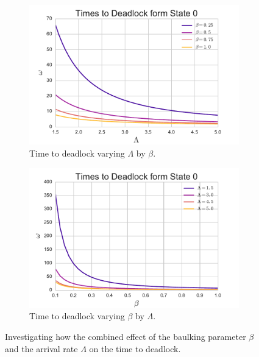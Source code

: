 \documentclass{article}
\begin{document}
\begin{figure}
\begin{center}
\begin{subfigure}[b]{0.45\textwidth}
    \includegraphics[width=\textwidth]{img/varylambda_bybeta.pdf}
    \caption{Time to deadlock varying $\Lambda$ by $\beta$.}
    \label{fig:varyLambdabybeta}
\end{subfigure}
\begin{subfigure}[b]{0.45\textwidth}
    \includegraphics[width=\textwidth]{img/varybeta_bylambda.pdf}
    \caption{Time to deadlock varying $\beta$ by $\Lambda$.}
    \label{fig:varybetabyLambda}
\end{subfigure}
\end{center}
\caption{Investigating how the combined effect of the baulking parameter $\beta$ and the arrival rate $\Lambda$ on the time to deadlock.}
\label{fig:combinedeffect_betalambda}
\end{figure}
\end{document}
